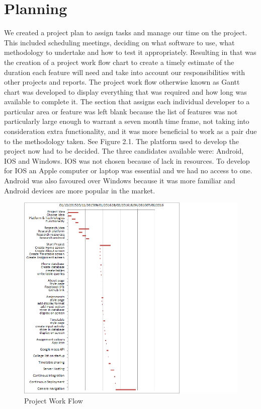 \section{Planning}
We created a project plan to assign tasks and manage our time on the project. This included scheduling meetings, deciding on what software to use, what methodology to undertake and how to test it appropriately. Resulting in that was the creation of a project work flow chart to create a timely estimate of the duration each feature will need and take into account our responsibilities with other projects and reports. The project work flow otherwise known as Gantt chart was developed to display everything that was required and how long was available to complete it. The section that assigns each individual developer to a particular area or feature was left blank because the list of features was not particularly large enough to warrant a seven month time frame, not taking into consideration extra functionality, and it was more beneficial to work as a pair due to the methodology taken. See Figure 2.1. The platform used to develop the project now had to be decided. The three candidates available were: Android, IOS and Windows. IOS was not chosen because of lack in resources. To develop for IOS an Apple computer or laptop was essential and we had no access to one. Android was also favoured over Windows because it was more familiar and Android devices are more popular in the market.

\begin{figure}
	\includegraphics{img/gannt.png}
	\caption{Project Work Flow}
\end{figure}

